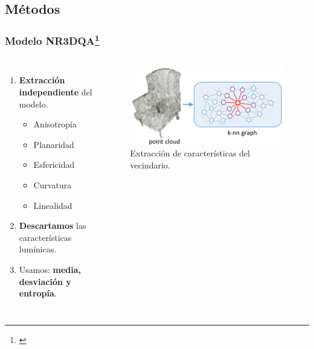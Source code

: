 \subsection{Métodos}
\begin{frame}
  \frametitle{Modelo NR3DQA\footnote[frame]{\cite{NR3DQA}}}
  \begin{columns}
    \begin{enumerate}
      \item \textbf{Extracción independiente} del modelo.
        \begin{itemize}
          \item Anisotropía
          \item Planaridad
          \item Esfericidad 
          \item Curvatura 
          \item Linealidad
        \end{itemize}
      \item \textbf{Descartamos} las características lumínicas.
      \item Usamos: \textbf{media, desviación y entropía}.
    \end{enumerate}
    \begin{figure}
      \begin{center}
        \includegraphics[width=\textwidth]{imagenes/chapter3/PatchSelection}
      \end{center}
      \caption{Extracción de características del vecindario.}
    \end{figure}
    \end{columns}
\end{frame}

